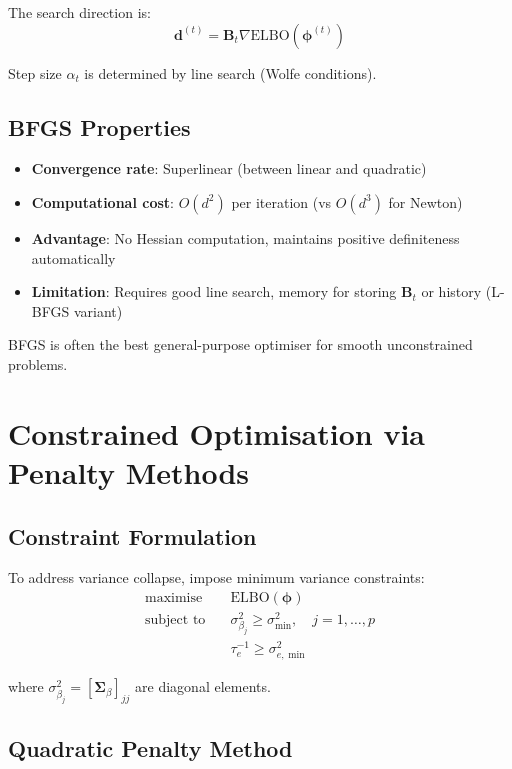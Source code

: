 \documentclass[11pt]{article}
\newcommand{\ELBO}{\text{ELBO}}
\begin{document}
The search direction is:
\begin{equation}
\bm{d}^{(t)} = \bm{B}_t \nabla \ELBO(\bm{\phi}^{(t)})
\end{equation}

Step size $\alpha_t$ is determined by line search (Wolfe conditions).

\subsection{BFGS Properties}

\begin{itemize}
\item \textbf{Convergence rate}: Superlinear (between linear and quadratic)
\item \textbf{Computational cost}: $O(d^2)$ per iteration (vs $O(d^3)$ for Newton)
\item \textbf{Advantage}: No Hessian computation, maintains positive definiteness automatically
\item \textbf{Limitation}: Requires good line search, memory for storing $\bm{B}_t$ or history (L-BFGS variant)
\end{itemize}

BFGS is often the best general-purpose optimiser for smooth unconstrained problems.

\section{Constrained Optimisation via Penalty Methods}

\subsection{Constraint Formulation}

To address variance collapse, impose minimum variance constraints:
\begin{align}
\text{maximise} \quad & \ELBO(\bm{\phi})\\
\text{subject to} \quad & \sigma^2_{\beta_j} \geq \sigma^2_{\min}, \quad j = 1,\ldots,p\\
& \tau_e^{-1} \geq \sigma^2_{e,\min}
\end{align}

where $\sigma^2_{\beta_j} = [\bm{\Sigma}_\beta]_{jj}$ are diagonal elements.

\subsection{Quadratic Penalty Method}
\end{document}

